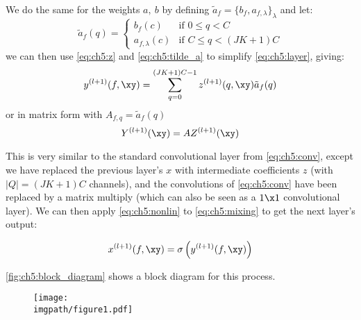 We do the same for the weights $a,\ b$ by defining $\tilde{a}_f = \{b_f, a_{f,
\lambda} \}_{\lambda}$ and let:
\begin{equation}
  \tilde{a}_f(q) =  \left\{
    \begin{array}{ll}
      b_f(c) & \mbox{if } 0 \leq q < C \\
      a_{f, \lambda}(c) & \mbox{if }	C \leq q < (JK+1)C
    \end{array}
    \right. \label{eq:ch5:tilde_a}
\end{equation}
%
we can then use \eqref{eq:ch5:z} and \eqref{eq:ch5:tilde_a} to simplify 
\eqref{eq:ch5:layer}, giving:
\begin{equation}
  y^{(l+1)}(f, \xy)  =  \sum_{q=0}^{(JK + 1)C - 1} z^{(l+1)}(q, \xy) \tilde{a}_f(q) \label{eq:ch5:mixing}
\end{equation}
or in matrix form with $A_{f,q} = \tilde{a}_f(q)$
%
\begin{equation}
  Y^{(l+1)}(\xy)  =  A Z^{(l+1)}(\xy) \label{eq:ch5:matrix}
\end{equation}

This is very similar to the standard convolutional layer from
\eqref{eq:ch5:conv}, except we have replaced the previous layer's $x$ with
intermediate coefficients $z$ (with $|Q| = (JK+1)C$ channels), and the
convolutions of \eqref{eq:ch5:conv} have been replaced by a matrix multiply
(which can also be seen as a $1\x 1$ convolutional layer). We can then apply
\eqref{eq:ch5:nonlin} to \eqref{eq:ch5:mixing} to get the next layer's output:

\begin{equation}
  x^{(l+1)}(f, \xy) = \sigma\left( y^{(l+1)}(f, \xy) \right)
  \label{eq:ch5:xnext}
\end{equation}

\autoref{fig:ch5:block_diagram} shows a block diagram for this process. 

\begin{figure}[t!]
  \centering
  \texttt{[image: \\imgpath/figure1.pdf]}
  \label{fig:ch5:block_diagram}
\end{figure}

